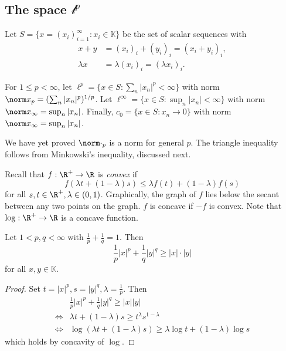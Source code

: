 \documentclass[a4paper]{article}
\newcommand{\K}{{\mathbb{K}}} %
\begin{document}
\subsection{The space \(\mathcal l^p\)}

Let \(S = \{x = (x_i)_{i = 1}^\infty: x_i \in \K\}\) be the set of scalar sequences with
\begin{align*}
  x + y &= (x_i)_i + (y_i)_i = (x_i + y_i)_i, \\
  \lambda x &= \lambda (x_i)_i = (\lambda x_i)_i.
\end{align*}

\begin{definition}
  For \(1 \leq p < \infty\), let \(\ell^p = \{x \in S: \sum_n |x_n|^p < \infty\}\) with norm \(\norm x_p = (\sum_n |x_n|^p)^{1/p}\). Let \(\ell^\infty = \{x \in S: \sup_n |x_n| < \infty\}\) with norm \(\norm x_\infty = \sup_n |x_n|\). Finally, \(c_0 = \{x \in S: x_n \to 0\}\) with norm \(\norm x_\infty = \sup_n |x_n|\).
\end{definition}

We have yet proved \(\norm \cdot_p\) is a norm for general \(p\). The triangle inequality follows from Minkowski's inequality, discussed next.

Recall that \(f: \R^+ \to \R\) is \emph{convex} if
\[
  f(\lambda t + (1 - \lambda) s) \leq \lambda f(t) + (1 - \lambda) f(s)
\]
for all \(s, t \in \R^+, \lambda \in (0, 1)\). Graphically, the graph of \(f\) lies below the secant between any two points on the graph. \(f\) is concave if \(-f\) is convex. Note that \(\log: \R^+ \to \R\) is a concave function.

\begin{corollary}
  Let \(1 < p, q < \infty\) with \(\frac{1}{p} + \frac{1}{q} = 1\). Then
  \[
    \frac{1}{p} |x|^p + \frac{1}{q} |y|^q \geq |x| \cdot |y|
  \]
  for all \(x, y \in \K\).
\end{corollary}

\begin{proof}
  Set \(t = |x|^p, s = |y|^q, \lambda = \frac{1}{p}\). Then
  \begin{align*}
    &\frac{1}{p} |x|^p + \frac{1}{q} |y|^q \geq |x| |y| \\
    \iff& \lambda t + (1 - \lambda) s \geq t^\lambda s^{1 - \lambda} \\
    \iff& \log (\lambda t + (1 - \lambda) s) \geq \lambda \log t + (1 - \lambda) \log s
  \end{align*}
  which holds by concavity of \(\log\).
\end{proof}
\end{document}
